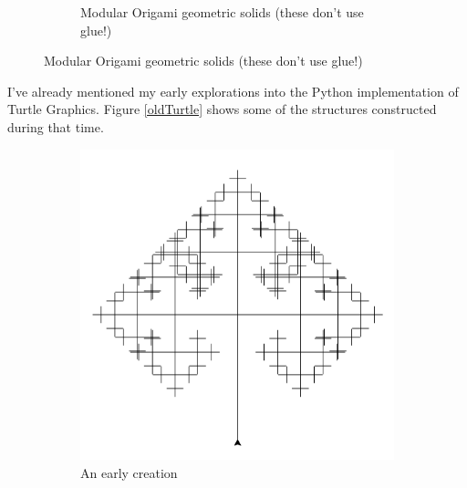 \documentclass[12pt,twoside]{reedthesis}
\begin{document}
\begin{figure}[h]
\begin{subfigure}{0.58\linewidth}
		\caption{Modular Origami geometric solids (these don't use glue!)}
		\label{papershapes}
	\end{subfigure}
	\end{figure}
	
	
	I've already mentioned my early explorations into the Python implementation of Turtle Graphics. Figure \ref{oldTurtle} shows some of the structures constructed during that time.\\
	
	\begin{figure}[h]
	\centering
	\begin{subfigure}{0.5\linewidth}
		\centering
		\includegraphics[width=\linewidth]{Images/OldTurtle1}
		\caption{An early creation}
		\label{ThreeHollowRects}
	\end{subfigure}%
	\hfill
	\begin{subfigure}{0.5\linewidth}
		\centering

\end{subfigure}
\end{figure}
\end{document}
